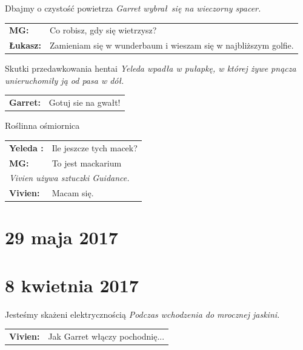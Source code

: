 \documentclass[10pt,twoside,twocolumn]{book}
\begin{document}
\begin{rpg-quotebox}{Dbajmy o czystość powietrza}
   \textit{Garret wybrał się na wieczorny spacer.}\\
   
   \begin{tabularx}{\columnwidth}{lX}
      \textbf{MG:} & Co robisz, gdy się wietrzysz?\\
      \textbf{Łukasz:} & Zamieniam się w wunderbaum i wieszam się w najbliższym golfie. \\
   \end{tabularx}
\end{rpg-quotebox}


\begin{rpg-quotebox}{Skutki przedawkowania hentai}
   \textit{Yeleda wpadła w pułapkę, w której żywe pnącza unieruchomiły ją od pasa w dół.}\\
   
   \begin{tabularx}{\columnwidth}{lX}
      \textbf{Garret:} & Gotuj sie na gwałt! \\
   \end{tabularx}
\end{rpg-quotebox}


\begin{rpg-quotebox}{Roślinna ośmiornica}
   \begin{tabularx}{\columnwidth}{lX}
      \textbf{Yeleda :} & Ile jeszcze tych macek?\\
      \textbf{MG:} & To jest mackarium\\
      \multicolumn{2}{l}{\textit{Vivien używa sztuczki Guidance.}}\\
      \textbf{Vivien:} & Macam się.\\
   \end{tabularx}
\end{rpg-quotebox}


\section*{29 maja 2017}

\section*{8 kwietnia 2017}


\begin{rpg-quotebox}{Jesteśmy skażeni elektrycznością}
   \textit{Podczas wchodzenia do mrocznej jaskini.}\\
   
   \begin{tabularx}{\columnwidth}{lX}
      \textbf{Vivien:} & Jak Garret włączy pochodnię...\\
   \end{tabularx}
\end{rpg-quotebox}
\end{document}
